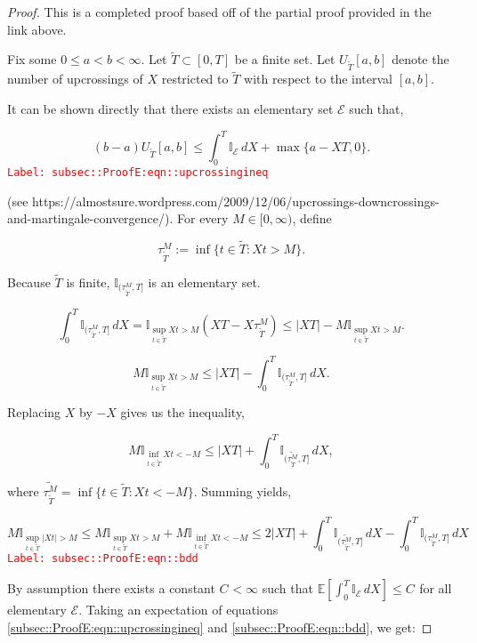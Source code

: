 \documentclass[12pt]{article}
\newcommand{\mb}{\mathbb}
\newcommand{\mc}{\mathcal}
\newcommand{\tr}{\textcolor{red}}
\newcommand{\labe}[1]{\tr{\texttt{Label: #1}}}
\newcommand{\ind}{\hspace{24pt}}
\newcommand{\ex}[1]{\mb{E}\left[#1\right]}			%
\newcommand{\T}{T}								%
\renewcommand{\t}{t}							%
\newcommand{\X}{X}								%
\newcommand{\rt}[1]{\tau^{#1}}						%
\newcommand{\const}[1]{C_{#1}}						%
\newcommand{\alt}{\widetilde}						%
\newcommand{\evnt}{\mc{E}}						%
\begin{document}
\begin{proof}
This is a completed proof based off of the partial proof provided in the link above.

\ind Fix some \(0\leq a < b < \infty\). Let \(\alt{T} \subset [0,\T]\) be a finite set. Let \(U_{\alt{\T}}[a,b]\) denote the number of upcrossings of \(\X{}{}\) restricted to \(\alt{\T}\) with respect to the interval \([a,b]\).

\ind It can be shown directly that there exists an elementary set \(\evnt\) such that,

\begin{equation}
(b-a)U_{\alt{T}}[a,b] \leq \int_0^\T \mb{I}_{\evnt}\,d\X{}{} + \max\{a - \X{}{\T},0\}.
\label{subsec::ProofE:eqn::upcrossingineq}
\end{equation}
\labe{subsec::ProofE:eqn::upcrossingineq}

(see https://almostsure.wordpress.com/2009/12/06/upcrossings-downcrossings-and-martingale-convergence/). For every \(M \in [0,\infty)\), define

\[\rt{M}_{\alt{T}} := \inf\{\t\in \alt{\T}: \X{}{\t} > M\}.\]

Because \(\alt{T}\) is finite, \(\mb{I}_{(\rt{M}_{\alt{T}},\T]}\) is an elementary set.

\[\int_0^\T \mb{I}_{(\rt{M}_{\alt{T}},\T]}\,d\X{}{} = \mb{I}_{\sup_{\t\in \alt{T}} \X{}{\t} > M}(\X{}{\T} - \X{}{\rt{M}_{\alt{T}}}) \leq |\X{}{\T}| - M\mb{I}_{\sup_{\t \in \alt{T}} \X{}{\t} > M}.\]

\[M\mb{I}_{\sup_{\t\in\alt{T}} \X{}{\t} > M} \leq |\X{}{\T}| - \int_0^T \mb{I}_{(\rt{M}_{\alt{T}},\T]}\,d\X{}{}.\]


Replacing \(\X{}{}\) by \(-\X{}{}\) gives us the inequality,

\[M\mb{I}_{\inf_{\t\in\alt{T}} \X{}{\t} < -M} \leq |\X{}{\T}| + \int_0^T \mb{I}_{(\alt{\rt{M}_{\alt{T}}},\T]}\,d\X{}{},\]

where \(\alt{\rt{M}_{\alt{T}}} = \inf\{\t\in \alt{T}: \X{}{\t} < -M\}\). Summing yields,

\begin{equation}
M\mb{I}_{\sup_{\t\in\alt{T}}|\X{}{\t}| > M} \leq M\mb{I}_{\sup_{\t\in\alt{T}}\X{}{\t} > M} + M\mb{I}_{\inf_{\t\in\alt{T}}\X{}{\t} < -M} \leq 2|\X{}{\T}| + \int_0^\T \mb{I}_{(\alt{\rt{M}_{\alt{T}}},\T]}\,d\X{}{} - \int_0^\T \mb{I}_{(\rt{M}_{\alt{T}},\T]}\,d\X{}{}
\label{subsec::ProofE:eqn::bdd}
\end{equation}
\labe{subsec::ProofE:eqn::bdd}

By assumption there exists a constant \(\const{} < \infty\) such that \(\ex{\int_0^\T \mb{I}_{\evnt}\,d\X{}{}} \leq \const{}\) for all elementary \(\evnt\). Taking an expectation of equations \eqref{subsec::ProofE:eqn::upcrossingineq} and \eqref{subsec::ProofE:eqn::bdd}, we get:


\end{proof}
\end{document}
